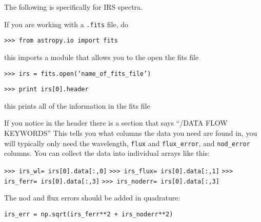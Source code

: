 \documentclass{article}
\begin{document}
The following is specifically for IRS spectra.

If you are working with a \texttt{.fits} file, do

\vspace{2mm}
\texttt{>>> from astropy.io import fits}  
\vspace{2mm}

this imports a module that allows you to the open the fits file 

\vspace{2mm}
\texttt{>>> irs = fits.open(`name\_of\_fits\_file')}
\vspace{2mm}

\vspace{2mm}	
\texttt{>>> print irs[0].header}  
\vspace{2mm}
	
this prints all of the information in the fits file
	
\noindent If you notice in the header there is a section that says ``/DATA FLOW KEYWORDS'' This tells  you what columns the data you need are found in, you will typically only need the wavelength,  \texttt{flux} and \texttt{flux\_error}, and \texttt{nod\_error} columns. You can collect the data into individual arrays like this:

\vspace{2mm}
\texttt{>>> irs\_wl= irs[0].data[:,0]}
\texttt{>>> irs\_flux= irs[0].data[:,1]}
\texttt{>>> irs\_ferr= irs[0].data[:,3]}
\texttt{>>> irs\_noderr= irs[0].data[:,3]}

\vspace{2mm}	

\noindent The nod and flux errors should be added in quadrature:

\vspace{2mm}
\texttt{irs\_err = np.sqrt(irs\_ferr**2 + irs\_noderr**2)}
\vspace{2mm}

	   


\end{document}
